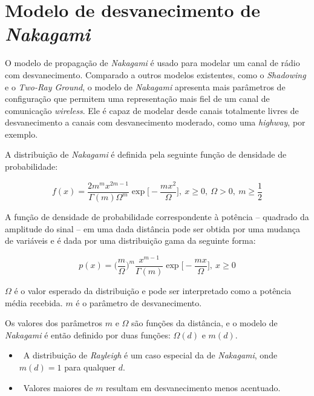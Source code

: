 \chapter{Modelo de desvanecimento de \textit{Nakagami}}
\label{apendice:nakagami}

O modelo de propagação de \textit{Nakagami} é usado para modelar um
canal de rádio com desvanecimento. Comparado a outros modelos existentes, como
o \textit{Shadowing} e o \textit{Two-Ray Ground}, o modelo de \textit{Nakagami}
apresenta mais parâmetros de configuração que permitem uma representação mais
fiel de um canal de comunicação \textit{wireless}. Ele é capaz de modelar
desde canais totalmente livres de desvanecimento a canais com desvanecimento
moderado, como uma \textit{highway}, por exemplo.

A distribuição de \textit{Nakagami} \cite{nakagami1957m} é definida pela
seguinte função de densidade de probabilidade:

\begin{displaymath}
f(x) =
\frac{2m^{m}x^{2m-1}}{\Gamma(m)\Omega^{m}}\exp\Bigg[-\frac{mx^{2}}{\Omega}\Bigg],
\ x \geq 0,\ \Omega > 0,\ m \geq \frac{1}{2}
\end{displaymath}

A função de densidade de probabilidade correspondente à potência -- quadrado da
amplitude do sinal -- em uma dada distância pode ser obtida por uma mudança de
variáveis e é dada por uma distribuição gama da seguinte forma:

\begin{displaymath}
p(x) =
\Bigg(\frac{m}{\Omega}\Bigg)^{m}\frac{x^{m-1}}{\Gamma(m)}\exp\Bigg[-\frac{mx}{\Omega}\Bigg],
\ x \geq 0
\end{displaymath}

$\Omega$ é o valor esperado da distribuição e pode ser interpretado como a
potência média recebida. $m$ é o parâmetro de desvanecimento.

Os valores dos parâmetros $m$ e $\Omega$ são funções da distância, e o modelo
de \textit{Nakagami} é então definido por duas funções: $\Omega(d)$ e $m(d)$.

\begin{itemize}
  \item\ A distribuição de \textit{Rayleigh} \cite{papoulis2002probability}
  é um caso especial da de \textit{Nakagami}, onde $m(d) = 1$ para qualquer $d$.
  \item\ Valores maiores de $m$ resultam em desvanecimento menos acentuado.
\end{itemize}

